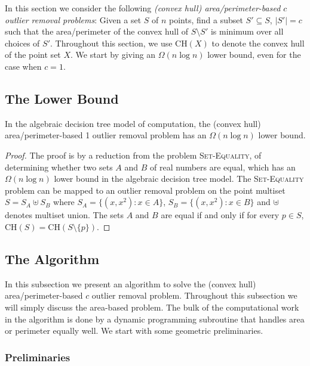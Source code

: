 \documentclass[lotsofwhite]{patmorin}
\newcommand{\ch}{\mathrm{CH}}
\begin{document}
In this section we consider the following \emph{(convex hull)
area/perimeter-based $c$ outlier removal problems}:  Given a set $S$
of $n$ points, find a subset $S'\subseteq S$, $|S'|=c$ such that the
area/perimeter of the convex hull of $S\setminus S'$ is minimum over
all choices of $S'$.  Throughout this section, we use $\ch(X)$ to
denote the convex hull of the point set $X$. We start by giving an
$\Omega(n\log n)$ lower bound, even for the case when $c=1$.


\subsection{The Lower Bound}


\begin{thm}
In the algebraic decision tree model of computation, the (convex hull)
area/perimeter-based 1 outlier removal problem has an 
$\Omega(n\log n)$ lower bound.
\end{thm}

\begin{proof}
The proof is by a reduction from the problem \textsc{Set-Equality}, of
determining whether two sets $A$ and $B$ of real numbers are equal,
which has an $\Omega(n\log n)$ lower bound in the algebraic decision
tree model.  The \textsc{Set-Equality} problem can be mapped to an
outlier removal problem on the point multiset $S=S_A \uplus S_B$ where
$S_A=\{(x,x^2): x\in A\}$, $S_B=\{(x,x^2):x\in B\}$ and $\uplus$
denotes multiset union. The sets $A$ and $B$ are equal if and only if
for every $p\in S$, $\ch(S)=\ch(S\setminus\{p\})$. 
\end{proof}

\subsection{The Algorithm}

In this subsection we present an algorithm to solve the (convex hull)
area/perimeter-based $c$ outlier removal problem.  Throughout this
subsection we will simply discuss the area-based problem.  The bulk of
the computational work in the algorithm is done by a dynamic
programming subroutine that handles area or perimeter equally well.
We start with some geometric preliminaries.

\subsubsection{Preliminaries} 
\end{document}
